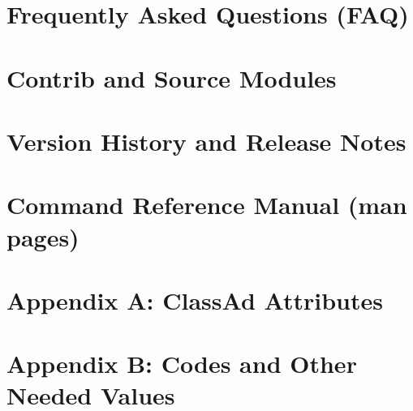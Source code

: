 \documentclass[titlepage,oneside,latex2html,ps2pdf,bookmarks,bookmarksnumbered,plainpages=false,pdfpagelabels]{book}
\begin{document}
\chapter{Frequently Asked Questions (FAQ)}
\label{sec:FAQ}


\chapter{Contrib and Source Modules}
\label{sec:Contrib}


\chapter{Version History and Release Notes}
\label{Version-History}


\chapter{Command Reference Manual (man pages)}
\label{sec:command-reference}


%
%
  \fancyhead[LE,RO]{\thepage}
  \fancyhead[RE]{\leftmark}
  \fancyhead[LO]{\rightmark}


\chapter{Appendix A:  ClassAd Attributes}
\label{sec:ClassAd-Attributes}

\chapter{Appendix B:  Codes and Other Needed Values}
\label{sec:Magic-Numbers}



\backmatter
{}
\label{index}
\printindex
\end{document}
